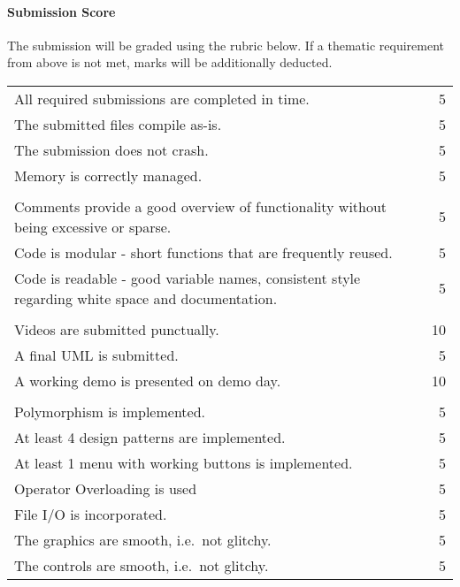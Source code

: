 \documentclass[addpoints]{exam}
\begin{document}
\begin{questions}
  \paragraph{Submission Score} The submission will be graded using the rubric below. If a thematic requirement from above is not met, marks will be additionally deducted.\\
  \begin{tabularx}{\textwidth}{|p{}|R|}
    \hline    {}
 \\\hline 
All required submissions are completed in time. & 5\\\hline
The submitted files compile as-is. & 5\\\hline
The submission does not crash. & 5\\\hline
Memory is correctly managed. & 5\\\hline
    \hline    {}
 \\\hline 
Comments provide a good overview of functionality without being excessive or sparse. & 5\\\hline
Code is modular - short functions that are frequently reused. & 5\\\hline
Code is readable - good variable names, consistent style regarding white space and documentation. & 5\\\hline
    \hline    {}
 \\\hline 
Videos are submitted punctually. & 10\\\hline
A final UML is submitted. & 5\\\hline
A working demo is presented on demo day. & 10\\\hline
    \hline    {}
 \\\hline 
Polymorphism is implemented. & 5\\\hline
At least 4 design patterns are implemented. & 5\\\hline
At least 1 menu with working buttons is implemented. & 5\\\hline
Operator Overloading is used & 5\\\hline
File I/O is incorporated. & 5\\\hline
The graphics are smooth, i.e.\ not glitchy. & 5\\\hline
The controls are smooth, i.e.\ not glitchy. & 5\\\hline

\end{tabularx}
\end{questions}
\end{document}
